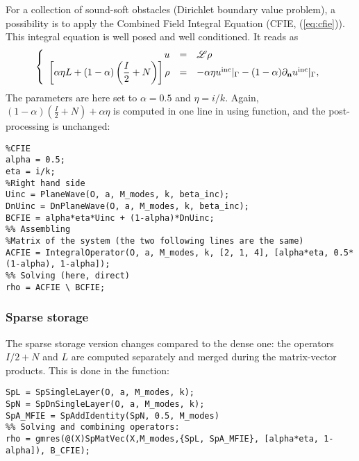 For a collection of sound-soft obstacles (Dirichlet boundary value problem), a possibility is to apply the Combined Field Integral Equation (CFIE, (\ref{eq:cfie})). This integral equation is well posed and well conditioned. It reads as
$$
\left\{\begin{array}{r c l}
u &=& {\mathscr L}\rho\\
\displaystyle \left[\alpha\eta L  + (1-\alpha)\left(\frac{I}{2}+N\right)\right]\rho &=& -\alpha\eta u^{\textrm{inc}}|_{\Gamma} - (1-\alpha) \partial_{\mathbf{n}}u^{\textrm{inc}}|_{\Gamma},
\end{array}\right.
$$
The parameters are here set to $\alpha=0.5$ and $\eta = i/k$. Again, $(1-\alpha)\left(\frac{I}{2}+N\right) + \alpha\eta$ is computed in one line in \mudiff using \IntegralOperator function, and the post-processing is unchanged:
\begin{lstlisting}
%CFIE
alpha = 0.5;
eta = i/k;
%Right hand side
Uinc = PlaneWave(O, a, M_modes, k, beta_inc);
DnUinc = DnPlaneWave(O, a, M_modes, k, beta_inc);
BCFIE = alpha*eta*Uinc + (1-alpha)*DnUinc;
%% Assembling
%Matrix of the system (the two following lines are the same)
ACFIE = IntegralOperator(O, a, M_modes, k, [2, 1, 4], [alpha*eta, 0.5*(1-alpha), 1-alpha]);
%% Solving (here, direct)
rho = ACFIE \ BCFIE;
\end{lstlisting}

\subsubsection{Sparse storage}

The sparse storage version changes compared to the dense one: the operators $I/2 + N$ and $L$ are computed separately and merged during the matrix-vector products. This is done in the \SpMatVec function:
\begin{lstlisting}
SpL = SpSingleLayer(O, a, M_modes, k);
SpN = SpDnSingleLayer(O, a, M_modes, k);
SpA_MFIE = SpAddIdentity(SpN, 0.5, M_modes)
%% Solving and combining operators:
rho = gmres(@(X)SpMatVec(X,M_modes,{SpL, SpA_MFIE}, [alpha*eta, 1-alpha]), B_CFIE);
\end{lstlisting}


